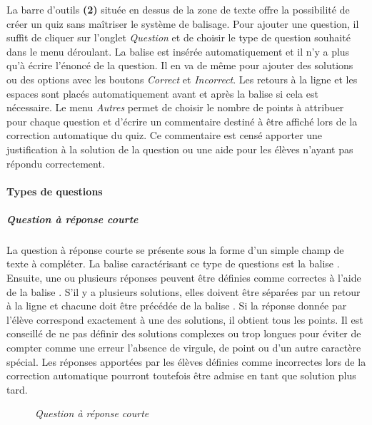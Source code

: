 \documentclass[a4paper,11pt,openany,oneside]{sphinxmanual}
\begin{document}
La barre d'outils \textbf{(2)} située en dessus de la zone de texte offre la possibilité de créer un quiz sans maîtriser le système de balisage. Pour ajouter une question, il suffit de cliquer sur l'onglet \emph{Question} et de choisir le type de question souhaité dans le menu déroulant. La balise est insérée automatiquement et il n'y a plus qu'à écrire l'énoncé de la question. Il en va de même pour ajouter des solutions ou des options avec les boutons \emph{Correct} et \emph{Incorrect}. Les retours à la ligne et les espaces sont placés automatiquement avant et après la balise si cela est nécessaire. Le menu \emph{Autres} permet de choisir le nombre de points à attribuer pour chaque question et d'écrire un commentaire destiné à être affiché lors de la correction automatique du quiz. Ce commentaire est censé apporter une justification à la solution de la question ou une aide pour les élèves n'ayant pas répondu correctement.


\paragraph{Types de questions}
\label{doc-user:types-de-questions}

\subparagraph{Question à réponse courte}
\label{doc-user:question-a-reponse-courte}
La question à réponse courte se présente sous la forme d'un simple champ de texte à compléter. La balise caractérisant ce type de questions est la balise . Ensuite, une ou plusieurs réponses peuvent être définies comme correctes à l'aide de la balise \code{=}. S'il y a plusieurs solutions, elles doivent être séparées par un retour à la ligne et chacune doit être précédée de la balise \code{=}. Si la réponse donnée par l'élève correspond exactement à une des solutions, il obtient tous les points. Il est conseillé de ne pas définir des solutions complexes ou trop longues pour éviter de compter comme une erreur l'absence de virgule, de point ou d'un autre caractère spécial. Les réponses apportées par les élèves définies comme incorrectes lors de la correction automatique pourront toutefois être admise en tant que solution plus tard.
\begin{figure}[htbp]
\centering
\capstart

\caption{\emph{Question à réponse courte}}\end{figure}
\end{document}
